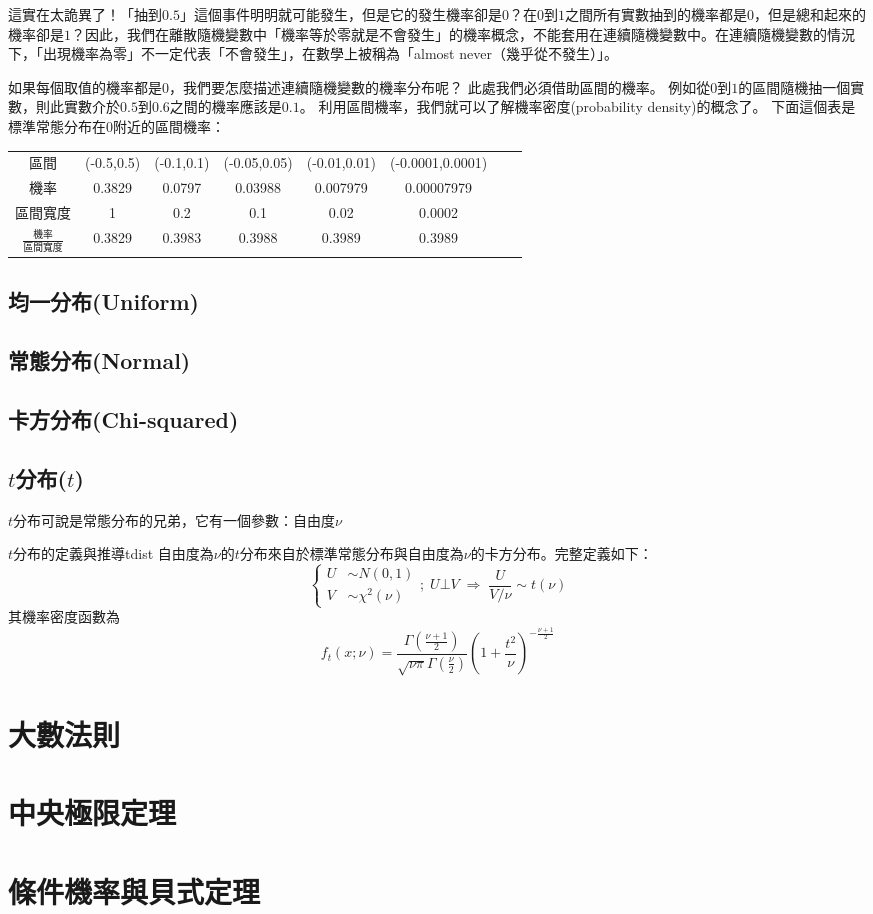 這實在太詭異了！「抽到$0.5$」這個事件明明就可能發生，但是它的發生機率卻是$0$？在$0$到$1$之間所有實數抽到的機率都是$0$，但是總和起來的機率卻是$1$？因此，我們在離散隨機變數中「機率等於零就是不會發生」的機率概念，不能套用在連續隨機變數中。在連續隨機變數的情況下，「出現機率為零」不一定代表「不會發生」，在數學上被稱為「almost never（幾乎從不發生）」。

如果每個取值的機率都是$0$，我們要怎麼描述連續隨機變數的機率分布呢？
此處我們必須借助區間的機率。
例如從$0$到$1$的區間隨機抽一個實數，則此實數介於$0.5$到$0.6$之間的機率應該是$0.1$。
利用區間機率，我們就可以了解機率密度(probability density)的概念了。
下面這個表是標準常態分布在$0$附近的區間機率：

\begin{tabular}{cccccccc}
    區間 & (-0.5,0.5) & (-0.1,0.1) & (-0.05,0.05) & (-0.01,0.01) & (-0.0001,0.0001)\\
    機率 & 0.3829 & 0.0797 & 0.03988 & 0.007979 & 0.00007979\\
    區間寬度 & 1 & 0.2 & 0.1 & 0.02 & 0.0002\\
    $\frac{\text{機率}}{\text{區間寬度}}$ & 0.3829 & 0.3983 & 0.3988 & 0.3989 & 0.3989
\end{tabular}

\subsection{均一分布(Uniform)}

\subsection{常態分布(Normal)}

\subsection{卡方分布(Chi-squared)}

\subsection{$t$分布($t$)}

$t$分布可說是常態分布的兄弟，它有一個參數：自由度$\nu$

\begin{bonus}{$t$分布的定義與推導}{tdist}
自由度為$\nu$的$t$分布來自於標準常態分布與自由度為$\nu$的卡方分布。完整定義如下：
$$\left\{\begin{aligned}
U &\sim N(0,1)\\
V &\sim \chi^2(\nu)
\end{aligned}\right. ;\; U \bot V \; \Rightarrow \; \frac{U}{V/\nu} \sim t(\nu)$$
其機率密度函數為
$$f_t(x;\nu)=\frac{\Gamma(\frac{\nu+1}{2})}{\sqrt{\nu\pi}\Gamma(\frac{\nu}{2})}\left(1+\frac{t^2}{\nu}\right)^{-\frac{\nu+1}{2}}$$
\end{bonus}

\section{大數法則}

\section{中央極限定理}

\section{條件機率與貝式定理}